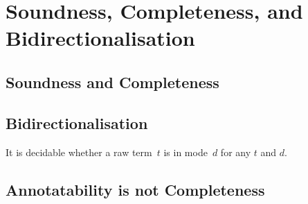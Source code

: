 
\section{Soundness, Completeness, and Bidirectionalisation} \label{sec:annotatability}

\subsection{Soundness and Completeness}
\begin{theorem}[Soundness]\label{thm:term-soundness}
    
\end{theorem}



\begin{theorem}[Completeness]\label{thm:term-completeness}
    
\end{theorem}

\subsection{Bidirectionalisation}
\begin{proposition} \label{thm:bidirectionalisation}
  It is decidable whether a raw term~$t$ is in mode~$d$ for any $t$ and $d$.
\end{proposition}

\subsection{Annotatability is not Completeness}

